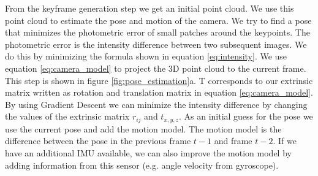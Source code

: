 \documentclass[11pt,a4paper,titlepage,oneside]{report}
\begin{document}
From the keyframe generation step we get an initial point cloud. We use this point cloud to estimate the pose and motion of the camera. We try to find a pose that minimizes the photometric error of small patches around the keypoints. The photometric error is the intensity difference between two subsequent images. We do this by minimizing the formula shown in equation \ref{eq:intensity}. We use equation \ref{eq:camera_model} to project the 3D point cloud to the current frame. This step is shown in figure \ref{fig:pose_estimation}a. T corresponds to our extrinsic matrix written as rotation and translation matrix in equation \ref{eq:camera_model}. By using Gradient Descent we can minimize the intensity difference by changing the values of the extrinsic matrix $r_{ij}$ and $t_{x,y,z}$. As an initial guess for the pose we use the current pose and add the motion model. The motion model is the difference between the pose in the previous frame $t-1$ and frame $t-2$. If we have an additional IMU available, we can also improve the motion model by adding information from this sensor (e.g. angle velocity from gyroscope).
\end{document}
